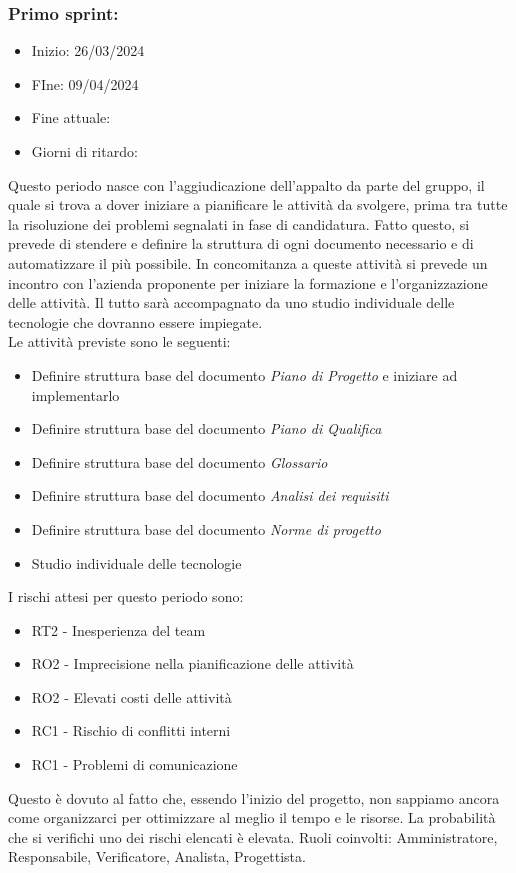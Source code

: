     \subsubsection{Primo sprint:}
        \begin{itemize}
            \item Inizio: 26/03/2024
            \item FIne: 09/04/2024
            \item Fine attuale:
            \item Giorni di ritardo:
        \end{itemize}
        Questo periodo nasce con l'aggiudicazione dell'appalto da parte del gruppo, il quale si trova a dover iniziare a pianificare le attività da svolgere, prima tra tutte la risoluzione dei problemi segnalati in fase di candidatura. Fatto questo, si prevede di stendere e definire la struttura di ogni documento necessario e di automatizzare il più possibile. In concomitanza a queste attività si prevede un incontro con l'azienda proponente per iniziare la formazione e l'organizzazione delle attività. Il tutto sarà accompagnato da uno studio individuale delle tecnologie che dovranno essere impiegate.\\ Le attività previste sono le seguenti:
        \begin{itemize}
            \item Definire struttura base del documento \textit{Piano di Progetto} e iniziare ad implementarlo
            \item Definire struttura base del documento \textit{Piano di Qualifica}
            \item Definire struttura base del documento \textit{Glossario}
            \item Definire struttura base del documento \textit{Analisi dei requisiti}
            \item Definire struttura base del documento \textit{Norme di progetto}
            \item Studio individuale delle tecnologie
        \end{itemize}
        I rischi attesi per questo periodo sono:
        \begin{itemize}
            \item RT2 - Inesperienza del team
            \item RO2 - Imprecisione nella pianificazione delle attività
            \item RO2 - Elevati costi delle attività
            \item RC1 - Rischio di conflitti interni 
            \item RC1 - Problemi di comunicazione
        \end{itemize}
        Questo è dovuto al fatto che, essendo l'inizio del progetto, non sappiamo ancora come organizzarci per ottimizzare al meglio il tempo e le risorse. La probabilità che si verifichi uno dei rischi elencati è elevata.
        Ruoli coinvolti: Amministratore, Responsabile, Verificatore, Analista, Progettista.

